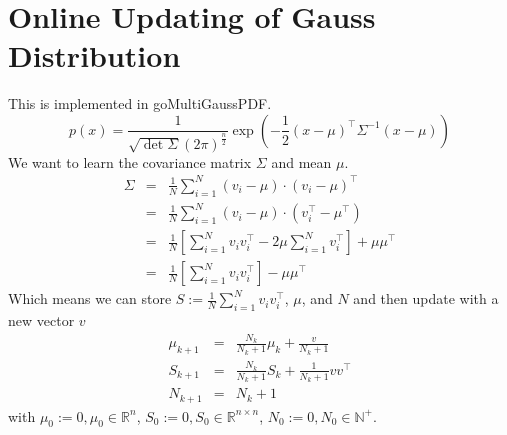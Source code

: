 \documentclass[a4paper]{article}
\begin{document}
\section{Online Updating of Gauss Distribution}
This is implemented in goMultiGaussPDF.
\[
    p(x) = \frac{1}{\sqrt{\det \Sigma} (2 \pi)^{\frac{n}{2}}} \exp \left( -\frac{1}{2} (x-\mu)^\top \Sigma^{-1} (x-\mu) \right)
\]
We want to learn the covariance matrix $\Sigma$ and mean $\mu$.
\begin{eqnarray*}
    \Sigma & = & \frac{1}{N} \sum\limits_{i=1}^{N} (v_i - \mu) \cdot (v_i - \mu)^\top \\
           & = & \frac{1}{N} \sum\limits_{i=1}^{N} (v_i - \mu) \cdot (v_i^\top - \mu^\top) \\
           & = & \frac{1}{N} \left[ \sum\limits_{i=1}^{N}v_iv_i^\top - 2\mu \sum\limits_{i=1}^{N} v_i^\top   \right]
                        + \mu \mu^\top \\
                        & = & \frac{1}{N} \left[ \sum\limits_{i=1}^{N} v_iv_i^\top \right] - \mu\mu^\top
\end{eqnarray*}
Which means we can store $S := \frac{1}{N} \sum\limits_{i=1}^{N} v_iv_i^\top$, $\mu$, and $N$ and
then update with a new vector $v$
\begin{eqnarray*}
    \mu_{k+1} & = & \frac{N_k}{N_k+1} \mu_k + \frac{v}{N_k+1} \\
    S_{k+1}   & = & \frac{N_k}{N_k+1} S_k + \frac{1}{N_k+1} vv^\top \\
    N_{k+1}   & = & N_k + 1
\end{eqnarray*}
with $\mu_0 := 0, \mu_0 \in \mathbb{R}^n$, $S_0 := 0, S_0 \in \mathbb{R}^{n\times n}$, $N_0 := 0, N_0 \in \mathbb{N}^+$.
\end{document}
